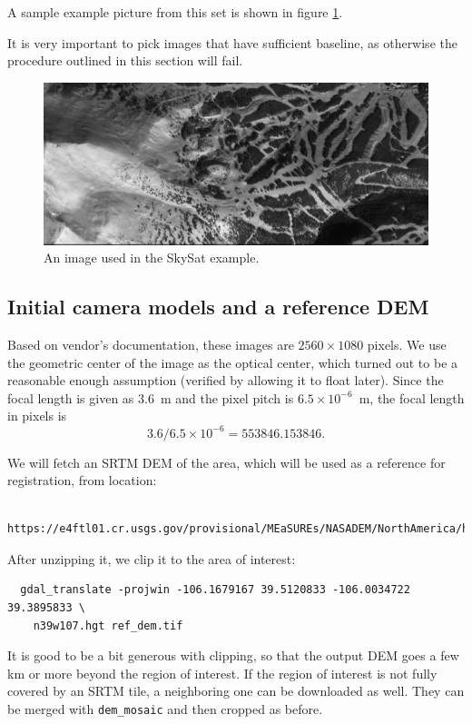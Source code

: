 A sample example picture from this set is shown in figure \ref{skysat-example}.

It is very important to pick images that have sufficient baseline, as otherwise 
the procedure outlined in this section will fail. 

\begin{figure}[h!]
\centering
\includegraphics[width=5.0in]{images/Breckenridge.jpg}
\caption{An image used in the SkySat example.}
\label{skysat-example}
\end{figure}

\subsection{Initial camera models and a reference DEM}

Based on vendor's documentation, these images are $2560 \times 1080$
pixels.  We use the geometric center of the image as the optical center,
which turned out to be a reasonable enough assumption (verified by
allowing it to float later). Since the focal length is given as 3.6~m and
the pixel pitch is $6.5 \times 10^{-6}$~m, the focal length in pixels is
$$
  3.6/6.5 \times 10^{-6} = 553846.153846. 
$$

We will fetch an SRTM DEM of the area, which will be used as a reference
for registration, from location: 

\begin{verbatim}
  https://e4ftl01.cr.usgs.gov/provisional/MEaSUREs/NASADEM/NorthAmerica/hgt_merge/n39w107.hgt.zip
\end{verbatim}

After unzipping it, we clip it to the area of interest:

\begin{verbatim}
  gdal_translate -projwin -106.1679167 39.5120833 -106.0034722 39.3895833 \
    n39w107.hgt ref_dem.tif
\end{verbatim}

It is good to be a bit generous with clipping, so that the output DEM
goes a few km or more beyond the region of interest. If the region of
interest is not fully covered by an SRTM tile, a neighboring one can be
downloaded as well.  They can be merged with \texttt{dem\_mosaic} and
then cropped as before.

